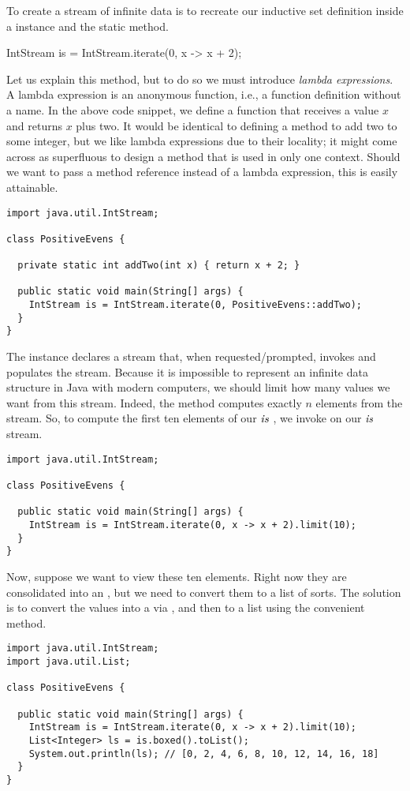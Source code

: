 To create a stream of infinite data is to recreate our inductive set definition inside a  instance and the  static method.

\begin{verbnobox}[\small]
IntStream is = IntStream.iterate(0, x -> x + 2);
\end{verbnobox}

Let us explain this method, but to do so we must introduce \emph{lambda expressions}. A lambda expression is an anonymous function, i.e., a function definition without a name. In the above code snippet, we define a function that receives a value $x$ and returns $x$ plus two. It would be identical to defining a  method to add two to some integer, but we like lambda expressions due to their locality; it might come across as superfluous to design a method that is used in only one context. Should we want to pass a method reference instead of a lambda expression, this is easily attainable.

\begin{lstlisting}[language=MyJava]
import java.util.IntStream;

class PositiveEvens {

  private static int addTwo(int x) { return x + 2; }

  public static void main(String[] args) {
    IntStream is = IntStream.iterate(0, PositiveEvens::addTwo);
  }
}   
\end{lstlisting}

The  instance declares a stream that, when requested/prompted, invokes and populates the stream. Because it is impossible to represent an infinite data structure in Java with modern computers, we should limit how many values we want from this stream. Indeed, the  method computes exactly $n$ elements from the stream. So, to compute the first ten elements of our $\emph{is}$ , we invoke  on our $\emph{is}$ stream. 

\begin{lstlisting}[language=MyJava]
import java.util.IntStream;

class PositiveEvens {
  
  public static void main(String[] args) {
    IntStream is = IntStream.iterate(0, x -> x + 2).limit(10);
  }
}
\end{lstlisting}
Now, suppose we want to view these ten elements. Right now they are consolidated into an , but we need to convert them to a list of sorts. The solution is to convert the values into a  via , and then to a list using the convenient  method.
\begin{lstlisting}[language=MyJava]
import java.util.IntStream;
import java.util.List;

class PositiveEvens {
  
  public static void main(String[] args) {
    IntStream is = IntStream.iterate(0, x -> x + 2).limit(10);
    List<Integer> ls = is.boxed().toList();
    System.out.println(ls); // [0, 2, 4, 6, 8, 10, 12, 14, 16, 18]
  }
}
\end{lstlisting}

